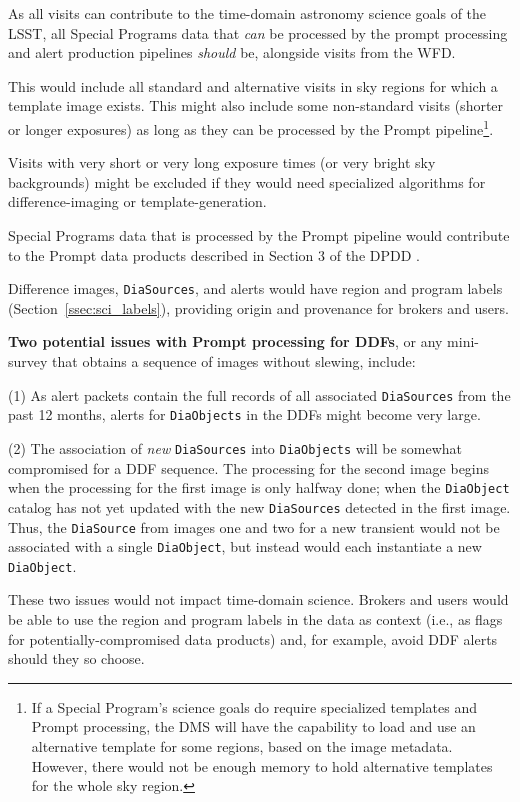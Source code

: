 As all visits can contribute to the time-domain astronomy science goals 
of the LSST, all Special Programs data that {\it can} be processed by the 
prompt processing and alert production pipelines {\it should} be, 
alongside visits from the WFD.

This would include all standard and alternative visits in sky regions for which 
a template image exists.
This might also include some non-standard visits (shorter or longer exposures) 
as long as they can be processed by the Prompt 
pipeline\footnote{If a Special Program's science goals do require 
specialized templates and 
Prompt processing, the DMS will have the capability to load and use an 
alternative template for some regions, based on the image metadata. 
However, there would not be enough memory to hold alternative templates 
for the whole sky region.}.

Visits with very short or very long exposure times (or very bright sky 
backgrounds) might be excluded if they would 
need specialized algorithms for difference-imaging or template-generation.

Special Programs data that is processed by the Prompt pipeline would 
contribute to the Prompt data products described in Section 3 of the 
DPDD . 

Difference images, {\tt DiaSources}, and alerts would have region and 
program labels (Section~\ref{ssec:sci_labels}), providing origin and
provenance for brokers and users.

\textbf{Two potential issues with Prompt processing for DDFs}, 
or any mini-survey that obtains a sequence of images without slewing, 
include:

(1) As alert packets contain the full records of all associated 
{\tt DiaSources} from the past 12 months, alerts for {\tt DiaObjects} in 
the DDFs might become very large.

(2) The association of {\it new} {\tt DiaSources} into {\tt DiaObjects} 
will be somewhat compromised for a DDF sequence.
The processing for the second image begins when the processing for the 
first image is only halfway done; when the {\tt DiaObject} catalog has 
not yet updated with the new {\tt DiaSources} detected in the first image.
Thus, the {\tt DiaSource} from images one and two for a new transient 
would not be associated with a single {\tt DiaObject}, but instead would 
each instantiate a new {\tt DiaObject}.

These two issues would not impact time-domain science.
Brokers and users would be able to use the region and program labels
in the data as context (i.e., as flags for potentially-compromised 
data products) and, for example, avoid DDF alerts should they so choose.


